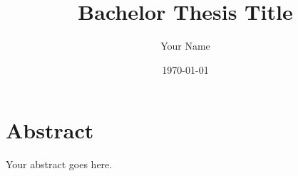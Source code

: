 \documentclass[12pt,a4paper]{report}
\title{Bachelor Thesis Title}
\author{Your Name}
\date{\today}
\begin{document}
\maketitle

\chapter*{Abstract}
Your abstract goes here.

\tableofcontents






\end{document}
